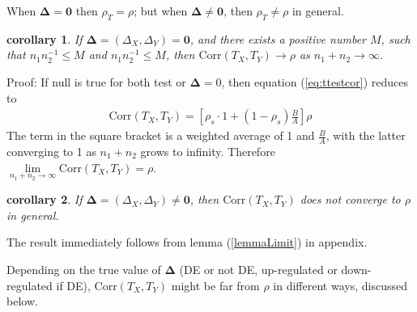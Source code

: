 \documentclass[12pt, a4paper]{article}
\newtheorem{corollary}{corollary}
\newcommand{\cor}{\text{Corr}}
\begin{document}
	 When $\bm \Delta = \bm 0$ then $\rho_T = \rho$; but when $\bm \Delta \neq \bm 0$, then $\rho_T \neq \rho$ in general. %
	\begin{corollary} 
	If $\bm \Delta  = (\Delta_X, \Delta_Y)= \bm 0$, and there exists a positive number $M$, such that  $n_1n_2^{-1}\leq M$ and $n_1n_2^{-1}\leq M$,  then $\cor({T_X, T_Y})\rightarrow \rho$ as $n_1 + n_2 \rightarrow \infty$. 
	\end{corollary}
	Proof:  If null is true for both test or $\bm \Delta  = 0$, then equation (\ref{eq:ttestcor}) reduces to
	\begin{align}\label{CalculateTCor}
		\cor(T_X, T_Y) = \left[\rho_s \cdot 1 + (1-\rho_s)\frac{B}{A}\right]\rho
	\end{align}
	The term in the square bracket is a weighted average of 1 and $\frac{B}{A}$, with the latter
	converging to 1 as $n_1 + n_2$ grows to infinity. Therefore $\lim\limits_{n_1 + n_2\rightarrow\infty} \cor({T_X, T_Y}) = \rho$.
	\begin{corollary} 
		If $\bm \Delta = (\Delta_X, \Delta_Y)\neq \bm 0$, then  $\cor({T_X,
			T_Y})$ does not converge to $\rho$ in general.
	\end{corollary} 
	The result immediately follows from lemma  (\ref{lemmaLimit}) in appendix.
	
	Depending on the true value of $\bm\Delta$ (DE or not DE, up-regulated or down-regulated if DE),
	$\cor({T_X, T_Y})$ might be far from $\rho$ in different ways, discussed below.
	
\end{document}
